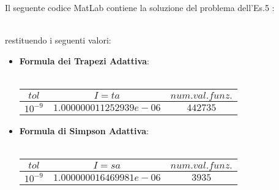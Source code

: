 Il seguente codice MatLab contiene la soluzione del problema dell'Es.5 :\\\
	
restituendo i seguenti valori:
\begin{itemize}
	\item
		\textbf{Formula dei Trapezi Adattiva}:\\\
		\begin{center}
		\begin{tabular}{|c|c|c|}
			\hline
				$tol$ & $I=ta$ & $num. val. funz.$ \\
    			\hline
    				$10^{-9}$ & $1.000000011252939e-06$ & $442735$ \\
				\hline
		\end{tabular}
		\end{center}
	\item
		\textbf{Formula di Simpson Adattiva}:\\\
		\begin{center}
		\begin{tabular}{|c|c|c|}
			\hline
				$tol$ & $I=sa$ & $num. val. funz.$ \\
    			\hline
    				$10^{-9}$ & $1.000000016469981e-06$ & $3935$ \\
				\hline
		\end{tabular}
		\end{center}
\end{itemize}
